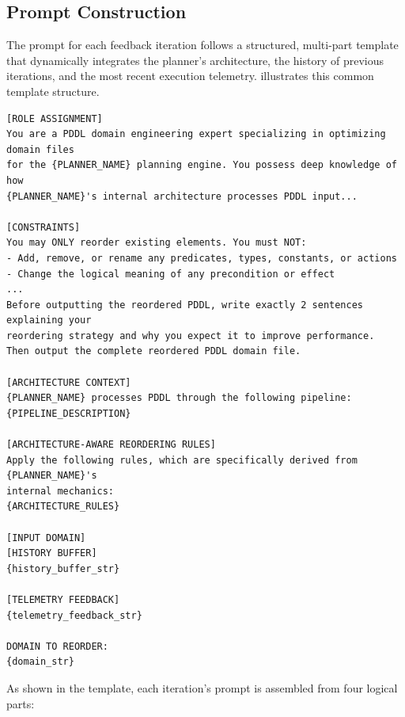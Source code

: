 \subsection{Prompt Construction}
\label{sec:design:stage3:prompt}

The prompt for each feedback iteration follows a structured, multi-part template that dynamically integrates the planner's architecture, the history of previous iterations, and the most recent execution telemetry. 
 illustrates this common template structure.

\begin{lstlisting}[language={}, caption={Common template structure for the Stage~3 LLM-Modulo feedback loop. Placeholders in braces are dynamically populated for each iteration.}, label={lst:stage3_template}, basicstyle=\scriptsize\ttfamily, numbers=none, frame=single, xleftmargin=0.5cm, xrightmargin=0.5cm, breaklines=true]
[ROLE ASSIGNMENT]
You are a PDDL domain engineering expert specializing in optimizing domain files
for the {PLANNER_NAME} planning engine. You possess deep knowledge of how
{PLANNER_NAME}'s internal architecture processes PDDL input...

[CONSTRAINTS]
You may ONLY reorder existing elements. You must NOT:
- Add, remove, or rename any predicates, types, constants, or actions
- Change the logical meaning of any precondition or effect
...
Before outputting the reordered PDDL, write exactly 2 sentences explaining your
reordering strategy and why you expect it to improve performance.
Then output the complete reordered PDDL domain file.

[ARCHITECTURE CONTEXT]
{PLANNER_NAME} processes PDDL through the following pipeline:
{PIPELINE_DESCRIPTION}

[ARCHITECTURE-AWARE REORDERING RULES]
Apply the following rules, which are specifically derived from {PLANNER_NAME}'s
internal mechanics:
{ARCHITECTURE_RULES}

[INPUT DOMAIN]
[HISTORY BUFFER]
{history_buffer_str}

[TELEMETRY FEEDBACK]
{telemetry_feedback_str}

DOMAIN TO REORDER:
{domain_str}
\end{lstlisting}

As shown in the template, each iteration's prompt is assembled from four logical parts:

